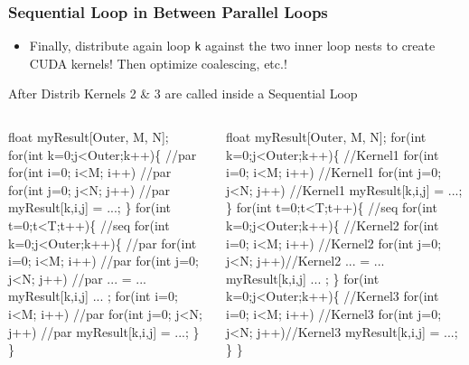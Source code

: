 \documentclass{beamer}
\newcommand{\emp}[1]{\textcolor{DikuRed}{ #1}}
\newcommand{\emphh}[1]{\textcolor{CosGreen}{ #1}}
\begin{document}
\begin{frame}[fragile,t]
  \frametitle{Sequential Loop in Between Parallel Loops} %

\begin{itemize}
    \item Finally, distribute again loop {\tt k} against the
            two inner loop nests to create CUDA kernels!
          Then optimize coalescing, etc.!
\end{itemize}

\begin{block}{After Distrib Kernels 2 \& 3 are called inside a Sequential Loop}
\begin{columns}
\begin{colorcode}
float myResult[Outer, M, N];
\emphh{for(int k=0;j<Outer;k++)\{ //par}
  \emphh{for(int i=0; i<M; i++) //par}
    \emphh{for(int j=0; j<N; j++) //par}
      \emp{myResult[k,i,j] = ...;}
\}
\emp{for(int t=0;t<T;t++)\{ //seq}
  \emphh{for(int k=0;j<Outer;k++)\{ //par}
    \emphh{for(int i=0; i<M; i++) //par}
      \emphh{for(int j=0; j<N; j++) //par}
        ... = ... \emp{myResult[k,i,j]} ... ;
    \emphh{for(int i=0; i<M; i++) //par}
      \emphh{for(int j=0; j<N; j++) //par}
        \emp{myResult[k,i,j]} = ...;
\emp{\}} \emphh{\}} 
\end{colorcode}
\begin{colorcode}
float myResult[Outer, M, N];
\emphh{for(int k=0;j<Outer;k++)\{  //Kernel1}
  \emphh{for(int i=0; i<M; i++)   //Kernel1}
    \emphh{for(int j=0; j<N; j++) //Kernel1}
      \emp{myResult[k,i,j] = ...;}
\}
\emp{for(int t=0;t<T;t++)\{ //seq}
  \emphh{for(int k=0;j<Outer;k++)\{ //Kernel2}
    \emphh{for(int i=0; i<M; i++)  //Kernel2}
      \emphh{for(int j=0; j<N; j++)//Kernel2}
        ... = ... \emp{myResult[k,i,j]} ... ;
  \emphh{\}}
  \emphh{for(int k=0;j<Outer;k++)\{ //Kernel3}
    \emphh{for(int i=0; i<M; i++)  //Kernel3}
      \emphh{for(int j=0; j<N; j++)//Kernel3}
        \emp{myResult[k,i,j]} = ...;
\emp{\}} \emphh{\}} 
\end{colorcode}
\end{columns}
\end{block} 

\end{frame}
\end{document}
